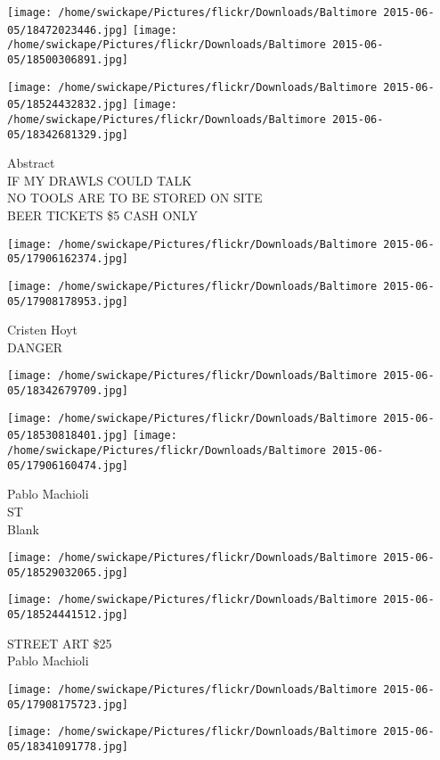 \documentclass[10pt,letterpaper]{article}
\begin{document}
\texttt{[image: /home/swickape/Pictures/flickr/Downloads/Baltimore 2015-06-05/18472023446.jpg]}
\texttt{[image: /home/swickape/Pictures/flickr/Downloads/Baltimore 2015-06-05/18500306891.jpg]}

\texttt{[image: /home/swickape/Pictures/flickr/Downloads/Baltimore 2015-06-05/18524432832.jpg]}
\texttt{[image: /home/swickape/Pictures/flickr/Downloads/Baltimore 2015-06-05/18342681329.jpg]}

Abstract\\
IF MY DRAWLS COULD TALK\\
NO TOOLS ARE TO BE STORED ON SITE\\
BEER TICKETS \$5 CASH ONLY
\pagebreak

\texttt{[image: /home/swickape/Pictures/flickr/Downloads/Baltimore 2015-06-05/17906162374.jpg]}

\vspace{0.25in}
\texttt{[image: /home/swickape/Pictures/flickr/Downloads/Baltimore 2015-06-05/17908178953.jpg]}

Cristen Hoyt\\
DANGER
\pagebreak

\texttt{[image: /home/swickape/Pictures/flickr/Downloads/Baltimore 2015-06-05/18342679709.jpg]}

\vspace{0.25in}
\texttt{[image: /home/swickape/Pictures/flickr/Downloads/Baltimore 2015-06-05/18530818401.jpg]}
\texttt{[image: /home/swickape/Pictures/flickr/Downloads/Baltimore 2015-06-05/17906160474.jpg]}

Pablo Machioli\\
ST\\
Blank
\pagebreak

\texttt{[image: /home/swickape/Pictures/flickr/Downloads/Baltimore 2015-06-05/18529032065.jpg]}

\vspace{0.25in}
\texttt{[image: /home/swickape/Pictures/flickr/Downloads/Baltimore 2015-06-05/18524441512.jpg]}

STREET ART \$25\\
Pablo Machioli
\pagebreak

\texttt{[image: /home/swickape/Pictures/flickr/Downloads/Baltimore 2015-06-05/17908175723.jpg]}

\vspace{0.25in}
\texttt{[image: /home/swickape/Pictures/flickr/Downloads/Baltimore 2015-06-05/18341091778.jpg]}
\end{document}
